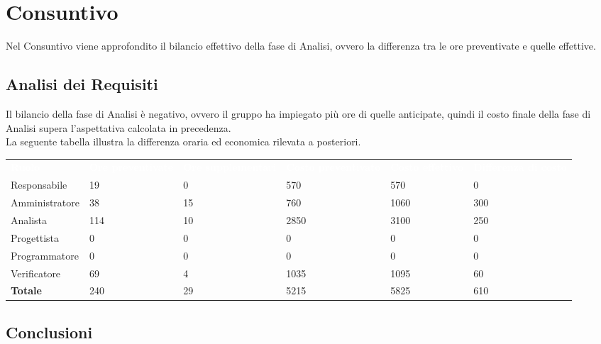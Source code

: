 \section{Consuntivo}


Nel Consuntivo viene approfondito il bilancio effettivo della fase di Analisi, ovvero la differenza tra le ore preventivate e quelle effettive.


\subsection{Analisi dei Requisiti}

Il bilancio della fase di Analisi è negativo, ovvero il gruppo ha impiegato più ore di quelle anticipate, quindi il costo finale della fase di Analisi supera l'aspettativa calcolata in precedenza.\\
La seguente tabella illustra la differenza oraria ed economica rilevata a posteriori.

\renewcommand{\arraystretch}{2}
\begin{table}[h]
\centering
\caption{Tabella del costo complessivo per ruolo}
\begin{longtable}{ C{2.5cm} C{2.5cm} C{2.5cm} C{2.5cm} C{2.5cm} C{2.5cm}}
	\textcolor{white}{\textbf{Ruolo}} & 
	\textcolor{white}{\textbf{Ore preventivate}} & 
	\textcolor{white}{\textbf{Ore supplementari}} & 
	\textcolor{white}{\textbf{Costo preventivato}} & 
	\textcolor{white}{\textbf{Costo effettivo}} & 
	\textcolor{white}{\textbf{Differenza di costo}}\\	
	
	Responsabile & 19 & 0 & 570 & 570 & 0 \\
	Amministratore & 38 & 15 & 760 & 1060 & 300 \\
	Analista & 114 & 10 & 2850 & 3100 & 250 \\
	Progettista & 0 & 0 & 0 & 0 & 0 \\
	Programmatore & 0 & 0 & 0 & 0 & 0 \\
	Verificatore & 69 & 4 & 1035 & 1095 & 60 \\
	\textbf{Totale} & 240 & 29 & 5215 & 5825 & 610 \\	
	
\end{longtable}
\end{table}

\subsection{Conclusioni}

